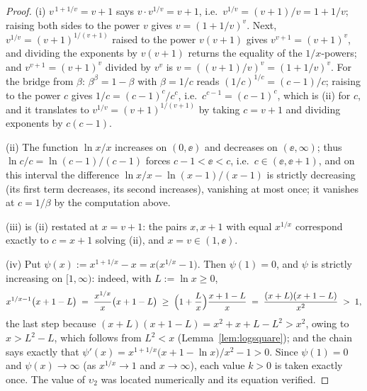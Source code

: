 \begin{proof}
(i) $v^{\,1+1/v} = v + 1$ says $v \cdot v^{1/v} = v+1$, i.e.\
$v^{1/v} = (v+1)/v = 1 + 1/v$; raising both sides to the power $v$
gives $v = (1+1/v)^{v}$. Next, $v^{1/v} = (v+1)^{1/(v+1)}$ raised to
the power $v(v+1)$ gives $v^{v+1} = (v+1)^{v}$, and dividing the
exponents by $v(v+1)$ returns the equality of the $1/x$-powers; and
$v^{v+1} = (v+1)^{v}$ divided by $v^{v}$ is $v = ((v+1)/v)^{v} =
(1+1/v)^{v}$. For the bridge from $\beta$: $\beta^{\beta} = 1-\beta$
with $\beta = 1/c$ reads $(1/c)^{1/c} = (c-1)/c$; raising to the power
$c$ gives $1/c = (c-1)^{c}/c^{c}$, i.e.\ $c^{c-1} = (c-1)^{c}$, which
is (ii) for $c$, and it translates to $v^{1/v} = (v+1)^{1/(v+1)}$ by
taking $c = v+1$ and dividing exponents by $c(c-1)$.

(ii) The function $\ln x / x$ increases on $(0,\ee)$ and decreases on
$(\ee,\infty)$; thus $\ln c/c = \ln(c-1)/(c-1)$ forces $c - 1 < \ee <
c$, i.e.\ $c \in (\ee, \ee+1)$, and on this interval the difference
$\ln x/x - \ln(x-1)/(x-1)$ is strictly decreasing (its first term
decreases, its second increases), vanishing at most once; it vanishes
at $c = 1/\beta$ by the computation above.

(iii) is (ii) restated at $x = v + 1$: the pairs $x, x+1$ with equal
$x^{1/x}$ correspond exactly to $c = x+1$ solving (ii), and
$x = v \in (1, \ee)$.

(iv) Put $\psi(x) := x^{1+1/x} - x = x\bigl(x^{1/x} - 1\bigr)$. Then
$\psi(1) = 0$, and $\psi$ is strictly increasing on $[1, \infty)$:
indeed, with $L := \ln x \ge 0$,
\[
    x^{1/x - 1}\bigl(x + 1 - L\bigr)
    \;=\; \frac{x^{1/x}}{x}\bigl(x + 1 - L\bigr)
    \;\ge\; \Bigl(1 + \frac{L}{x}\Bigr)\frac{x + 1 - L}{x}
    \;=\; \frac{(x + L)(x + 1 - L)}{x^{2}}
    \;>\; 1 ,
\]
the last step because $(x+L)(x+1-L) = x^{2} + x + L - L^{2} > x^{2}$,
owing to $x > L^{2} - L$, which follows from $L^{2} < x$
(Lemma~\ref{lem:logsquare}); and the chain says exactly that
$\psi'(x) = x^{1+1/x}\bigl(x+1-\ln x\bigr)/x^{2} - 1 > 0$. Since
$\psi(1) = 0$ and $\psi(x) \to \infty$ (as $x^{1/x} \to 1$ and
$x \to \infty$), each value $k > 0$ is taken exactly once. The value
of $\upsilon_2$ was located numerically and its equation verified.


\end{proof}
